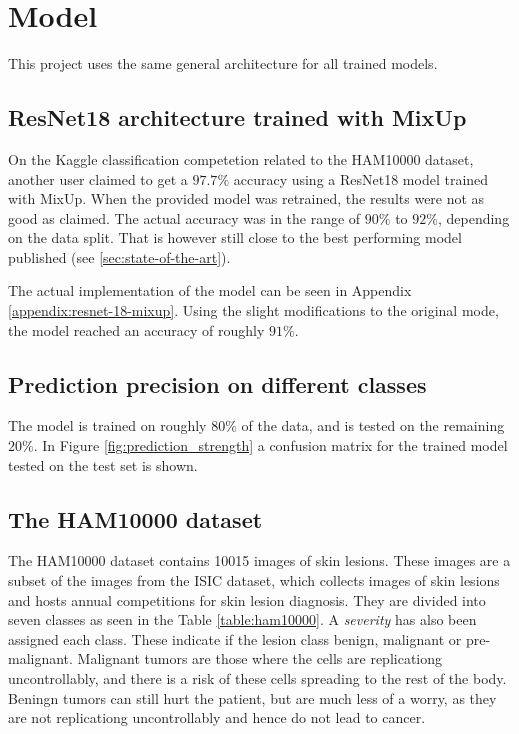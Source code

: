 \chapter{Model}\label{sec:model}
This project uses the same general architecture for all trained models.

\section{ResNet18 architecture trained with MixUp}
On the Kaggle classification competetion related to the HAM10000 dataset\cite{HAM10000-kaggle-competetion},
another user claimed to get a $97.7\%$ accuracy using a ResNet18 model trained with MixUp\cite{kaggle-97-model}.
When the provided model was retrained, the results were not as good as claimed.
The actual accuracy was in the range of $90\%$ to $92\%$, depending on the data split.
That is however still close to the best performing model published (see \ref{sec:state-of-the-art}).

The actual implementation of the model can be seen in Appendix \ref{appendix:resnet-18-mixup}.
Using the slight modifications to the original mode, the model reached an accuracy of roughly $91\%$.

\section{Prediction precision on different classes}
The model is trained on roughly $80\%$ of the data, and is tested on the remaining $20\%$.
In Figure \ref{fig:prediction_strength} a confusion matrix for the trained model tested on the test set is shown.

\section{The HAM10000 dataset}
The HAM10000 dataset contains 10015 images of skin lesions.
These images are a subset of the images from the ISIC dataset\cite{ISIC_Dataset_2018},
which collects images of skin lesions and hosts annual competitions for skin lesion diagnosis.
They are divided into seven classes as seen in the Table \ref{table:ham10000}.
A \textit{severity} has also been assigned each class.
These indicate if the lesion class benign, malignant or pre-malignant.
Malignant tumors are those where the cells are replicationg uncontrollably,
and there is a risk of these cells spreading to the rest of the body.
Beningn tumors can still hurt the patient, but are much less of a worry,
as they are not replicationg uncontrollably and hence do not lead to cancer.

